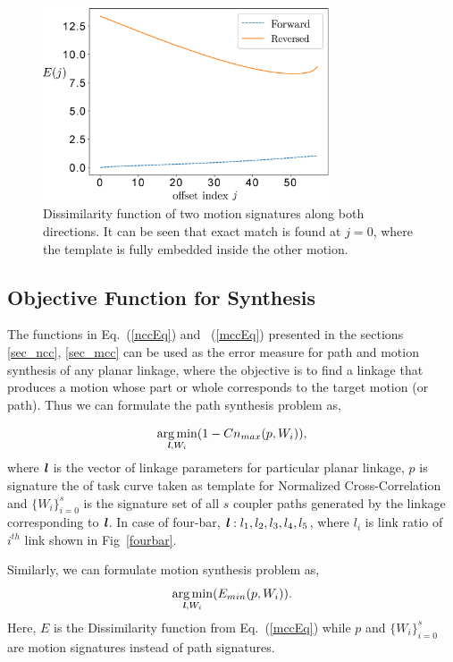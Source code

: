 \documentclass[twocolumn,10pt]{asme2ej}
\newcommand{\req}[1]{(\ref{#1})}
\DeclareMathOperator*{\argminA}{arg\,min}
\begin{document}
\begin{figure}
\centering
\includegraphics[width=240pt]{figure/fig_mcc.eps}
  \caption{Dissimilarity function of two motion signatures along both directions. It can be seen that exact match is found at $j=0$, where the template is fully embedded inside the other motion.}
\label{mcc}
\end{figure}

\subsection{Objective Function for Synthesis}
The functions in Eq.~\req{nccEq} and ~\req{mccEq} presented in the sections \ref{sec_ncc}, \ref{sec_mcc} can be used as the error measure for path and motion synthesis of any planar linkage, where the objective is to find a linkage that produces a motion whose part or whole corresponds to the target motion (or path).
Thus we can formulate the path synthesis problem as,

\begin{equation}\label{objectiveFunPath}
  \argminA_{\textbf{\emph{l}}, W_i} (1 - Cn_{max}(p, W_i)),
\end{equation}
where $\textbf{\emph{l}}$ is the vector of linkage parameters for particular planar linkage, $p$ is signature the of task curve taken as template for Normalized Cross-Correlation and ${\{W_i\}}_{i=0}^{s}$ is the signature set of all $s$ coupler paths generated by the linkage corresponding to $\textbf{\emph{l}}$.
In case of four-bar, $\textbf{\emph{l}}: l_1, l_2, l_3, l_4, l_5$, where $l_i$ is link ratio of $i^{th}$ link shown in Fig~\ref{fourbar}.

Similarly, we can formulate motion synthesis problem as,
\begin{equation}\label{objectiveFunMotion}
  \argminA_{\textbf{\emph{l}}, W_i} (E_{min}(p, W_i)).
\end{equation}
Here, $E$ is the Dissimilarity function from Eq.~\req{mccEq} while $p$ and ${\{W_i\}}_{i=0}^{s}$ are motion signatures instead of path signatures.
\end{document}
